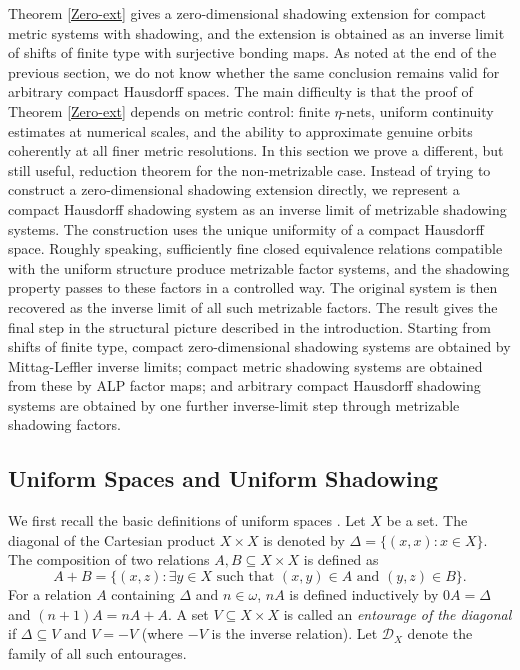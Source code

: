 \documentclass[12pt]{amsart}
\theoremstyle{definition}
\numberwithin{equation}{section}
\theoremstyle{remark}
\begin{document}
Theorem \ref{Zero-ext} gives a zero-dimensional shadowing extension for compact metric systems with shadowing, and the extension is obtained as an inverse limit of shifts of finite type with surjective bonding maps. As noted at the end of the previous section, we do not know whether the same conclusion remains valid for arbitrary compact Hausdorff spaces. The main difficulty is that the proof of Theorem \ref{Zero-ext} depends on metric control: finite $\eta$-nets, uniform continuity estimates at numerical scales, and the ability to approximate genuine orbits coherently at all finer metric resolutions. In this section we prove a different, but still useful, reduction theorem for the non-metrizable case. Instead of trying to construct a zero-dimensional shadowing extension directly, we represent a compact Hausdorff shadowing system as an inverse limit of metrizable shadowing systems. The construction uses the unique uniformity of a compact Hausdorff space. Roughly speaking, sufficiently fine closed equivalence relations compatible with the uniform structure produce metrizable factor systems, and the shadowing property passes to these factors in a controlled way. The original system is then recovered as the inverse limit of all such metrizable factors. The result gives the final step in the structural picture described in the introduction. Starting from shifts of finite type, compact zero-dimensional shadowing systems are obtained by Mittag-Leffler inverse limits; compact metric shadowing systems are obtained from these by ALP factor maps; and arbitrary compact Hausdorff shadowing systems are obtained by one further inverse-limit step through metrizable shadowing factors.

\subsection{Uniform Spaces and Uniform Shadowing}

We first recall the basic definitions of uniform spaces \cite{Eng}. Let $X$ be a set. The diagonal of the Cartesian product $X \times X$ is denoted by $\Delta = \{ (x, x) : x \in X \}$. The composition of two relations $A, B \subseteq X \times X$ is defined as 
\[A + B = \{ (x, z) : \exists y \in X \text{ such that } (x, y) \in A \text{ and } (y, z) \in B \}.\]
 For a relation $A$ containing $\Delta$ and $n \in \omega$, $nA$ is defined inductively by $0A = \Delta$ and $(n+1)A = nA + A$. A set $V \subseteq X \times X$ is called an \emph{entourage of the diagonal} if $\Delta \subseteq V$ and $V = -V$ (where $-V$ is the inverse relation). Let $\mathcal{D}_X$ denote the family of all such entourages. 
\end{document}
